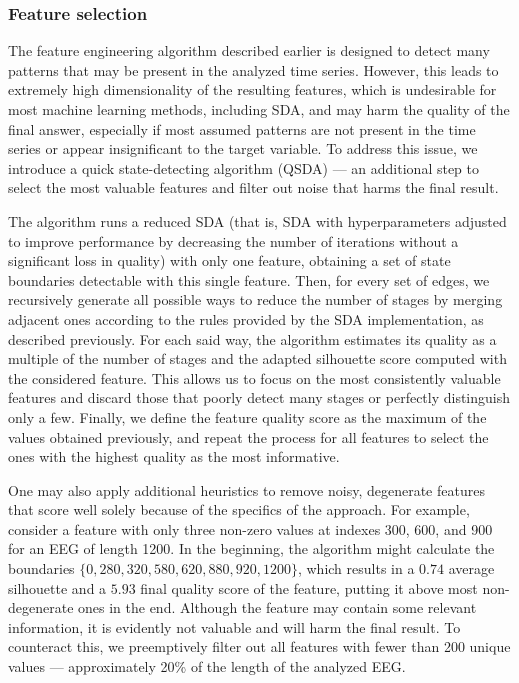 \documentclass[pdflatex,sn-basic,Numbered]{sn-jnl}
\begin{document}
\subsubsection{Feature selection}

The feature engineering algorithm described earlier is designed to detect many patterns that may be present in the analyzed time series. However, this leads to extremely high dimensionality of the resulting features, which is undesirable for most machine learning methods, including SDA, and may harm the quality of the final answer, especially if most assumed patterns are not present in the time series or appear insignificant to the target variable. To address this issue, we introduce a quick state-detecting algorithm (QSDA) --- an additional step to select the most valuable features and filter out noise that harms the final result. 

The algorithm runs a reduced SDA (that is, SDA with hyperparameters adjusted to improve performance by decreasing the number of iterations without a significant loss in quality) with only one feature, obtaining a set of state boundaries detectable with this single feature. Then, for every set of edges, we recursively generate all possible ways to reduce the number of stages by merging adjacent ones according to the rules provided by the SDA implementation, as described previously. For each said way, the algorithm estimates its quality as a multiple of the number of stages and the adapted silhouette score computed with the considered feature. This allows us to focus on the most consistently valuable features and discard those that poorly detect many stages or perfectly distinguish only a few. Finally, we define the feature quality score as the maximum of the values obtained previously, and repeat the process for all features to select the ones with the highest quality as the most informative.

One may also apply additional heuristics to remove noisy, degenerate features that score well solely because of the specifics of the approach. For example, consider a feature with only three non-zero values at indexes 300, 600, and 900 for an EEG of length 1200. In the beginning, the algorithm might calculate the boundaries $\{ 0, 280, 320, 580, 620, 880, 920, 1200 \}$, which results in a $0.74$ average silhouette and a $5.93$ final quality score of the feature, putting it above most non-degenerate ones in the end. Although the feature may contain some relevant information, it is evidently not valuable and will harm the final result. To counteract this, we preemptively filter out all features with fewer than 200 unique values --- approximately 20\% of the length of the analyzed EEG.\@
\end{document}
